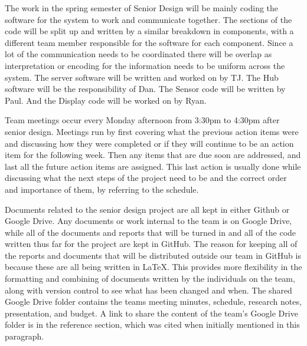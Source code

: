 \documentclass[PPFS.tex]{template/subfiles}
\begin{document}
	The work in the spring semester of Senior Design will be mainly coding the software for the system to work and communicate together. The sections of the code will be split up and written by a similar breakdown in components, with a different team member responsible for the software for each component. Since a lot of the communication needs to be coordinated there will be overlap as interpretation or encoding for the information needs to be uniform across the system. The server software will be written and worked on by TJ. The Hub software will be the responsibility of Dan. The Sensor code will be written by Paul. And the Display code will be worked on by Ryan. 

	Team meetings occur every Monday afternoon from 3:30pm to 4:30pm after senior design. Meetings run by first covering what the previous action items were and discussing how they were completed or if they will continue to be an action item for the following week. Then any items that are due soon are addressed, and last all the future action items are assigned. This last action is usually done while discussing what the next steps of the project need to be and the correct order and importance of them, by referring to the schedule.

	Documents related to the senior design project are all kept in either Github or Google Drive\cite{Google Drive}. Any documents or work internal to the team is on Google Drive, while all of the documents and reports that will be turned in and all of the code written thus far for the project are kept in GitHub. The reason for keeping all of the reports and documents that will be distributed outside our team in GitHub is because these are all being written in \LaTeX. This provides more flexibility in the formatting and combining of documents written by the individuals on the team, along with version control to see what has been changed and when. The shared Google Drive folder contains the teams meeting minutes, schedule, research notes, presentation, and budget. A link to share the content of the team's Google Drive folder is in the reference section, which was cited when initially mentioned in this paragraph. 
	
\end{document}
